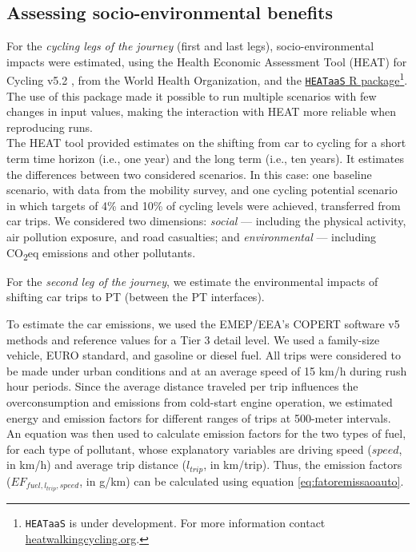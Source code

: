 \documentclass[review, doubleblind, 3p,
authoryear]{elsarticle} %
\begin{document}
\subsection{Assessing socio-environmental
benefits}\label{assessing-socio-environmental-benefits}

For the \emph{cycling legs of the journey} (first and last legs),
socio-environmental impacts were estimated, using the Health Economic
Assessment Tool (HEAT) for Cycling v5.2 \citep{HEAT}, from the World
Health Organization, and the
\href{https://github.com/HEAT-WHO/HEAT_heatr_api}{\texttt{HEATaaS} R
package}\footnote{\texttt{HEATaaS} is under development. For more
  information contact
  \href{https://heatwalkingcycling.org}{heatwalkingcycling.org}.}. The
use of this package made it possible to run multiple scenarios with few
changes in input values, making the interaction with HEAT more reliable
when reproducing runs.\\
The HEAT tool provided estimates on the shifting from car to cycling for
a short term time horizon (i.e., one year) and the long term (i.e., ten
years). It estimates the differences between two considered scenarios.
In this case: one baseline scenario, with data from the mobility survey,
and one cycling potential scenario in which targets of 4\% and 10\% of
cycling levels were achieved, transferred from car trips. We considered
two dimensions: \emph{social} --- including the physical activity, air
pollution exposure, and road casualties; and \emph{environmental} ---
including CO\textsubscript{2}eq emissions and other pollutants.

For the \emph{second leg of the journey}, we estimate the environmental
impacts of shifting car trips to PT (between the PT interfaces).

To estimate the car emissions, we used the EMEP/EEA's COPERT software v5
methods and reference values \citep{COPERT} for a Tier 3 detail level.
We used a family-size vehicle, EURO standard, and gasoline or diesel
fuel. All trips were considered to be made under urban conditions and at
an average speed of 15 km/h during rush hour periods. Since the average
distance traveled per trip influences the overconsumption and emissions
from cold-start engine operation, we estimated energy and emission
factors for different ranges of trips at 500-meter intervals.\\
An equation was then used to calculate emission factors for the two
types of fuel, for each type of pollutant, whose explanatory variables
are driving speed (\(speed\), in km/h) and average trip distance
(\(l_{trip}\), in km/trip). Thus, the emission factors
(\(EF_{fuel,l_{trip},speed}\), in g/km) can be calculated using equation
\ref{eq:fatoremissaoauto}.
\end{document}
